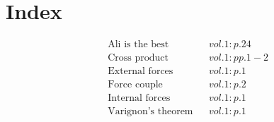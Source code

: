 \documentclass[a4paper]{article}
\begin{document}
 
\section*{Index} 
\begin{align*} 
&\text{Ali is the best}&& vol. 1: p. 24\\
&\text{Cross product}&& vol. 1: pp. 1-2\\
&\text{External forces}&& vol. 1: p. 1\\
&\text{Force couple}&& vol. 1: p. 2\\
&\text{Internal forces}&& vol. 1: p. 1\\
&\text{Varignon's theorem}&& vol. 1: p. 1\\
\end{align*} 
\end{document}
